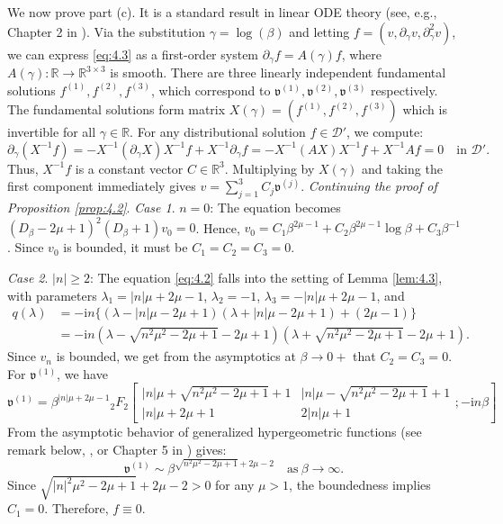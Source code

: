 \documentclass[11pt]{article}
\makeatletter
\renewenvironment{proof}[1][\proofname]{\par
  \vspace{-.7\topsep}%
  \pushQED{\qed}%
  \normalfont
  \topsep0pt \partopsep0pt %
  \trivlist
  \item[\hskip\labelsep
        \itshape
    #1\@addpunct{.}]\ignorespaces
}{%
  \popQED\endtrivlist\@endpefalse
  \addvspace{6pt plus 6pt} %
}
\theoremstyle{definition}
\theoremstyle{remark}
\numberwithin{equation}{section}
\newcommand{\mbb}{\mathbb}
\newcommand{\mcal}{\mathcal}
\newcommand{\mfrak}{\mathfrak}
\newcommand{\R}{\mbb{R}}
\newcommand{\del}{\partial}
\newcommand{\upindex}[1]{^{(#1)}}
\makeatother
\begin{document}
\begin{proof}[Proof of Lemma \ref{lem:4.3}]
We now prove part (c). It is a standard result in linear ODE theory (see, e.g., Chapter 2 in \cite{BV12}). Via the substitution $\gamma = \log(\beta)$ and letting $f=(v, \del_\gamma v, \del_\gamma^2 v)$, we can express \eqref{eq:4.3} as a first-order system $\del_\gamma f = A(\gamma) f$, where $A(\gamma) : \R \to \R^{3\times 3}$ is smooth. There are three linearly independent fundamental solutions $f\upindex{1}, f\upindex{2}, f\upindex{3}$, which correspond to $\mfrak{v}\upindex{1}, \mfrak{v}\upindex{2}, \mfrak{v}\upindex{3}$ respectively. The fundamental solutions form matrix $X(\gamma) = (f\upindex{1}, f\upindex{2}, f\upindex{3})$ which is invertible for all $\gamma\in\R$. For any distributional solution $f \in \mcal{D}'$, we compute:
$$ \del_\gamma (X^{-1} f) = -X^{-1}(\del_\gamma X)X^{-1}f + X^{-1}\del_\gamma f = -X^{-1}(AX)X^{-1}f + X^{-1}Af = 0 \quad \text{in } \mcal{D}'.$$
Thus, $X^{-1} f$ is a constant vector $C \in \mathbb{R}^3$. Multiplying by $X(\gamma)$ and taking the first component immediately gives $v = \sum_{j=1}^3 C_j \mfrak{v}\upindex{j}$.
\end{proof}
\noindent\textit{Continuing the proof of Proposition \ref{prop:4.2}}. \textit{Case 1}. $n=0$: The equation becomes $(D_\beta - 2\mu + 1)^2 (D_\beta + 1) v_0 = 0$. Hence, $v_0 = C_1 \beta^{2\mu - 1} + C_2 \beta^{2\mu - 1} \log\beta + C_3 \beta^{-1}$. Since $v_0$ is bounded, it must be $C_1 = C_2 = C_3 = 0$.

\noindent\textit{Case 2}. $|n| \geq 2$: The equation \eqref{eq:4.2} falls into the setting of Lemma \ref{lem:4.3}, with parameters $\lambda_1 = |n|\mu + 2\mu -1$, $\lambda_2 = -1$, $\lambda_3 = -|n|\mu + 2\mu - 1$, and
\begin{align*}
q(\lambda) &= -\textrm{i} n \{(\lambda - |n|\mu - 2\mu + 1)(\lambda + |n|\mu - 2\mu + 1) + (2\mu - 1)\} \\ &= -\textrm{i} n (\lambda - \sqrt{n^2 \mu^2 - 2\mu + 1} - 2\mu + 1)(\lambda + \sqrt{n^2 \mu^2 - 2\mu + 1} - 2\mu + 1).
\end{align*}
Since $v_n$ is bounded, we get from the asymptotics at $\beta \to 0+$ that $C_2 = C_3 = 0$. For $\mfrak{v}\upindex{1}$, we have
\[\mfrak{v}\upindex{1} = \beta^{|n|\mu + 2\mu - 1} {}_{2} F_2 \left[ \begin{matrix} |n|\mu + \sqrt{n^2\mu^2 - 2\mu + 1} + 1 & |n|\mu - \sqrt{n^2\mu^2 - 2\mu + 1} +1 \\ |n|\mu + 2\mu + 1 & 2|n|\mu + 1 \end{matrix} ; -\textrm{i}n\beta \right]\]
From the asymptotic behavior of generalized hypergeometric functions (see remark below,  \cite{AD10}, or Chapter 5 in \cite{Luk69}) gives:
\[ \mfrak{v}\upindex{1} \sim \beta^{\sqrt{n^2\mu^2 - 2\mu + 1} + 2\mu - 2} \quad \text{as}~ \beta \to \infty.\]
Since $\sqrt{|n|^2 \mu^2 - 2\mu + 1} + 2\mu - 2 > 0$ for any $\mu > 1$, the boundedness implies $C_1 = 0$. Therefore, $f \equiv 0$.
\end{document}
